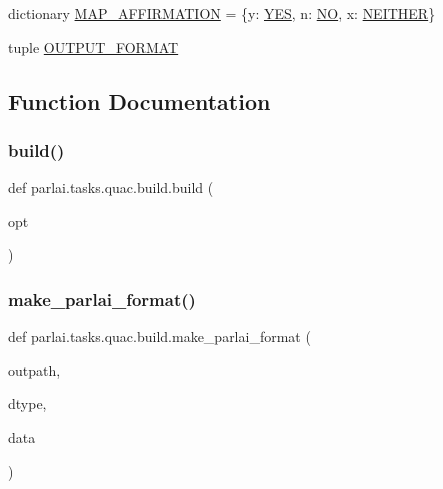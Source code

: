 \begin{DoxyCompactItemize}
\item 
dictionary \hyperlink{namespaceparlai_1_1tasks_1_1quac_1_1build_ab20c3d8515482b46022a2dbd6b0065a3}{M\+A\+P\+\_\+\+A\+F\+F\+I\+R\+M\+A\+T\+I\+ON} = \{\textquotesingle{}y\textquotesingle{}\+: \hyperlink{namespaceparlai_1_1tasks_1_1quac_1_1build_ae765b76a84d02581f82b38b996795052}{Y\+ES}, \textquotesingle{}n\textquotesingle{}\+: \hyperlink{namespaceparlai_1_1tasks_1_1quac_1_1build_a50beb08d880b27c076327f5a0a26d2e5}{NO}, \textquotesingle{}x\textquotesingle{}\+: \hyperlink{namespaceparlai_1_1tasks_1_1quac_1_1build_aea3d40b1bffbd55955c5d462803932c1}{N\+E\+I\+T\+H\+ER}\}
\item 
tuple \hyperlink{namespaceparlai_1_1tasks_1_1quac_1_1build_af556702b5497614148ac64bc9173d1bb}{O\+U\+T\+P\+U\+T\+\_\+\+F\+O\+R\+M\+AT}
\end{DoxyCompactItemize}


\subsection{Function Documentation}
\mbox{\label{namespaceparlai_1_1tasks_1_1quac_1_1build_a86e9b7d4a167a4dc22e925770ce42824}} 
\subsubsection{\texorpdfstring{build()}{build()}}
{\footnotesize\ttfamily def parlai.\+tasks.\+quac.\+build.\+build (\begin{DoxyParamCaption}\item[{}]{opt }\end{DoxyParamCaption})}

\mbox{\label{namespaceparlai_1_1tasks_1_1quac_1_1build_a08c212462b5c58cde91192d35f24f0cc}} 
\subsubsection{\texorpdfstring{make\+\_\+parlai\+\_\+format()}{make\_parlai\_format()}}
{\footnotesize\ttfamily def parlai.\+tasks.\+quac.\+build.\+make\+\_\+parlai\+\_\+format (\begin{DoxyParamCaption}\item[{}]{outpath,  }\item[{}]{dtype,  }\item[{}]{data }\end{DoxyParamCaption})}



